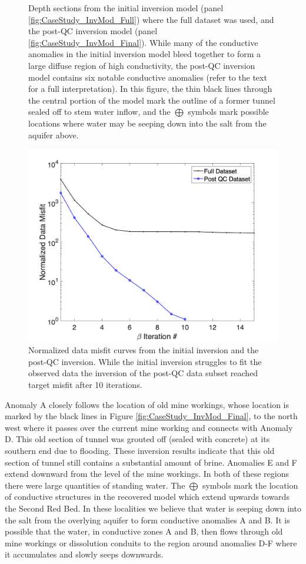 \documentclass[final,authoryear,5p,times,twocolumn]{elsarticle}
\begin{document}
\begin{figure}[!ht]
   \caption{Depth sections from the initial inversion model (panel \ref{fig:CaseStudy_InvMod_Full}) where the full dataset was used, and the post-QC inversion model (panel \ref{fig:CaseStudy_InvMod_Final}). While many of the conductive anomalies in the initial inversion model bleed together to form a large diffuse region of high conductivity, the post-QC inversion model contains six notable conductive anomalies (refer to the text for a full interpretation). In this figure, the thin black lines through the central portion of the model mark the outline of a former tunnel sealed off to stem water inflow, and the $\bigoplus$ symbols mark possible locations where water may be seeping down into the salt from the aquifer above.}
   \label{fig:CaseStudy_InvMod}
\end{figure}


\begin{figure} [!ht]
	\begin{center}
	\includegraphics[trim=1.3cm 0.2cm 2.6cm 1.2cm, clip=true,width=0.75\linewidth]{./Figures/Fig18.png}
	\end{center}
\caption{Normalized data misfit curves from the initial inversion and the post-QC inversion. While the initial inversion struggles to fit the observed data the inversion of the post-QC data subset reached target misfit after 10 iterations.}
\label{fig:CaseStudy_Inv_MisfitPlots}
\end{figure}

Anomaly A closely follows the location of old mine workings, whose location is marked by the black lines in Figure \ref{fig:CaseStudy_InvMod_Final}, to the north west where it passes over the current mine working and connects with Anomaly D. This old section of tunnel was grouted off (sealed with concrete) at its southern end due to flooding. These inversion results indicate that this old section of tunnel still contains a substantial amount of brine. Anomalies E and F extend downward from the level of the mine workings. In both of these regions there were large quantities of standing water. The $\bigoplus$ symbols mark the location of conductive structures in the recovered model which extend upwards towards the Second Red Bed. In these localities we believe that water is seeping down into the salt from the overlying aquifer to form conductive anomalies A and B. It is possible that the water, in conductive zones A and B, then flows through old mine workings or dissolution conduits to the region around anomalies D-F where it accumulates and slowly seeps downwards.
\end{document}
